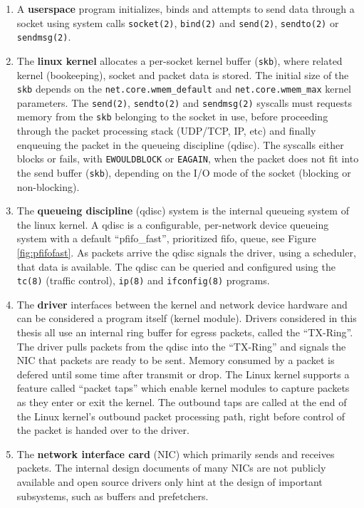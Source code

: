 \begin{enumerate}
	
	\item A \textbf{userspace} program initializes, binds and attempts to send
	data through a socket using system calls \texttt{socket(2)}, \texttt{bind(2)} 
	and \texttt{send(2)}, \texttt{sendto(2)} or \texttt{sendmsg(2)}.

	\item The \textbf{linux kernel} allocates a per-socket kernel buffer (\texttt{skb}), 
	where related kernel (bookeeping), socket and packet data is stored. The initial
	size of the \texttt{skb} depends on the \texttt{net.core.wmem\_default} and 
	\texttt{net.core.wmem\_max} kernel parameters. The \texttt{send(2)}, \texttt{sendto(2)} and 
	\texttt{sendmsg(2)} syscalls must requests memory from the \texttt{skb} belonging to the 
	socket in use, before proceeding through the packet processing stack (UDP/TCP, IP, etc) 
	and finally enqueuing the packet in the queueing discipline (qdisc). The syscalls
	either blocks or fails, with \texttt{EWOULDBLOCK} or \texttt{EAGAIN}, when the 
	packet does not fit into the send buffer (\texttt{skb}), depending on the I/O 
	mode of the socket (blocking or non-blocking).

	\item The \textbf{queueing discipline} (qdisc) system is the internal queueing system 
	of the linux kernel. A qdisc is a configurable, per-network device queueing system with a 
	default ``pfifo\_fast'', prioritized fifo, queue, see Figure \ref{fig:pfifofast}. As 
	packets arrive the qdisc signals the driver, using a scheduler, that data is available. 
	The qdisc can be queried and configured using the \texttt{tc(8)} (traffic control),
	\texttt{ip(8)} and \texttt{ifconfig(8)} programs. 

	\item The \textbf{driver} interfaces between the kernel and network device hardware and
	can be considered a program itself (kernel module). Drivers considered in this thesis
	all use an internal ring buffer for egress packets, called the ``TX-Ring''. The driver
	pulls packets from the qdisc into the ``TX-Ring'' and signals the NIC that packets are
	ready to be sent. Memory consumed by a packet is defered until some time after transmit
	or drop. The Linux kernel supports a feature called ``packet taps'' which enable kernel
	modules to capture packets as they enter or exit the kernel. The outbound taps are called 
	at the end of the Linux kernel's outbound packet processing path, right before control of 
	the packet is handed over to the driver.

	\item The \textbf{network interface card} (NIC) which primarily sends and receives packets. 
	The internal design documents of many NICs are not publicly available and open source
	drivers only hint at the design of important subsystems, such as buffers and prefetchers. 

\end{enumerate}

